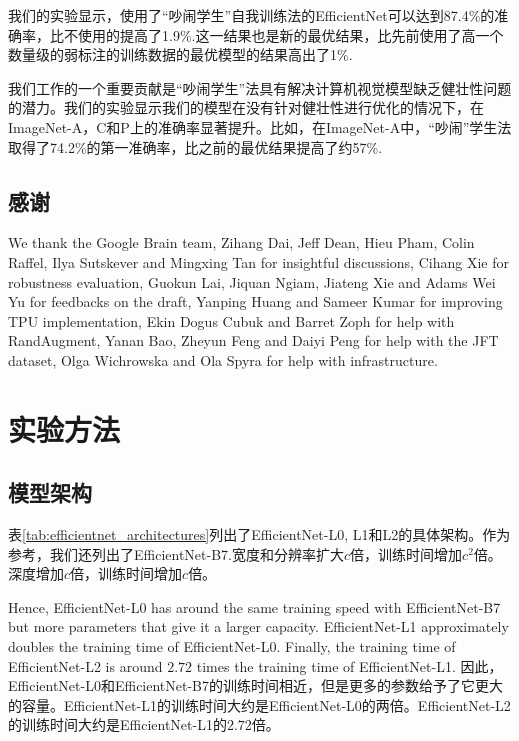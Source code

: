 \documentclass[10pt]{article}
\begin{document}
我们的实验显示，使用了“吵闹学生”自我训练法的EfficientNet可以达到87.4\%的准确率，比不使用的提高了1.9\%.这一结果也是新的最优结果，比先前使用了高一个数量级的弱标注的训练数据的最优模型\cite{mahajan2018exploring,touvron2019fixing}的结果高出了1\%.  


我们工作的一个重要贡献是“吵闹学生”法具有解决计算机视觉模型缺乏健壮性问题的潜力。我们的实验显示我们的模型在没有针对健壮性进行优化的情况下，在ImageNet-A，C和P上的准确率显著提升。比如，在ImageNet-A中，“吵闹”学生法取得了74.2\%的第一准确率，比之前的最优结果提高了约57\%. 

\subsection*{感谢}
We thank the Google Brain team, Zihang Dai, Jeff Dean, Hieu Pham, Colin Raffel, Ilya Sutskever and Mingxing Tan for insightful discussions, Cihang Xie for robustness evaluation, Guokun Lai, Jiquan Ngiam, Jiateng Xie and Adams Wei Yu for feedbacks on the draft, Yanping Huang and Sameer Kumar for improving TPU implementation,  Ekin Dogus Cubuk and Barret Zoph for help with RandAugment, Yanan Bao, Zheyun Feng and Daiyi Peng for help with the JFT dataset, Olga Wichrowska and Ola Spyra for help with infrastructure.




\newpage
\appendix
\section{实验方法}

\subsection{模型架构}
\label{sec:architecture_details}
表\ref{tab:efficientnet_architectures}列出了EfficientNet-L0, L1和L2的具体架构。作为参考，我们还列出了EfficientNet-B7.宽度和分辨率扩大$c$倍，训练时间增加$c^2$倍。深度增加$c$倍，训练时间增加$c$倍。  


Hence, EfficientNet-L0 has around the same training speed with EfficientNet-B7 but more parameters that give it a larger capacity. EfficientNet-L1 approximately doubles the training time of EfficientNet-L0. Finally, the training time of EfficientNet-L2 is around $2.72$ times the training time of EfficientNet-L1. 
因此，EfficientNet-L0和EfficientNet-B7的训练时间相近，但是更多的参数给予了它更大的容量。EfficientNet-L1的训练时间大约是EfficientNet-L0的两倍。EfficientNet-L2的训练时间大约是EfficientNet-L1的$2.72$倍。
\end{document}
